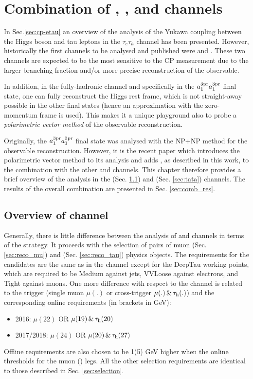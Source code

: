 \chapter{Combination of \et, \mt, and \tata channels}\label{sec:comb}

In Sec.\ref{sec:cp-etau} an overview of the analysis of the Yukawa coupling between the Higgs boson and tau leptons in the $\tau_e\tau_h$ channel has been presented. However, historically the first channels to be analysed and published were \mt and \tata \cite{CMS:2020rpr, Cardini:2021hbb}. These two channels are expected to be the most sensitive to the CP measurement due to the larger branching fraction and/or more precise reconstruction of the \phicp observable. 

In addition, in the fully-hadronic \tata channel and specifically in the $a_1^\text{3pr} a_1^\text{3pr}$ final state, one can fully reconstruct the Higgs rest frame, which is not straight-away possible in the other final states (hence an approximation with the zero-momentum frame is used). This makes it a unique playground also to probe a\textit{ polarimetric vector method} of the \phicp observable reconstruction. 

Originally, the $a_1^\text{3pr} a_1^\text{3pr}$ final state was analysed with the NP+NP method for the \phicp observable reconstruction. However, it is the recent paper \cite{CMS:2021sdq} which introduces the polarimetric vector method to its analysis and adds \et, as described in this work, to the combination with the other \mt and \tata channels. This chapter therefore provides a brief overview of the analysis in the \mt (Sec. \ref{sec:mt}) and \tata (Sec. \ref{sec:tata}) channels. The results of the overall combination are presented in Sec. \ref{sec:comb_res}.

\section{Overview of \mt channel}\label{sec:mt}
Generally, there is little difference between the analysis of \mt and \et channels in terms of the strategy. It proceeds with the selection of pairs of muon (Sec. \ref{sec:reco_mu}) and \tauh (Sec. \ref{sec:reco_tau}) physics objects. The requirements for the \tauh candidates are the same as in the \et channel except for the DeepTau working points, which are required to be Medium against jets, VVLoose against electrons, and Tight against muons. One more difference with respect to the \et channel is related to the trigger (single muon $\mu(.)$ or cross-trigger $\mu(.) \, \& \, \tau_\mathrm{h} (.)$) and the corresponding online \pt requirements (in brackets in GeV):
    \begin{itemize}
        \item 2016: $\mu(22)$ OR $\mu(19) \, \& \, \tau_\mathrm{h}(20)$
        \item 2017/2018: $\mu(24)$ OR $\mu(20) \, \& \, \tau_\mathrm{h}(27)$
    \end{itemize}
Offline \pt requirements are also chosen to be 1(5) GeV higher when the online \pt thresholds for the muon (\tauh) legs. All the other selection requirements are identical to those described in Sec. \ref{sec:selection}.

